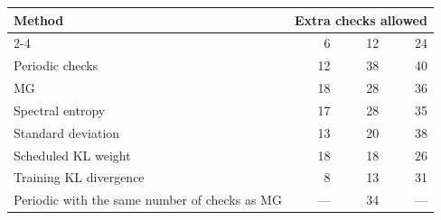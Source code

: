 \begin{tabular}{lrrr}
\toprule
Method & \multicolumn{3}{c}{Extra checks allowed} \\
\cmidrule(lr){2-4}
 & 6 & 12 & 24 \\
\midrule
Periodic checks & 12 & 38 & 40 \\
MG & 18 & 28 & 36 \\
Spectral entropy & 17 & 28 & 35 \\
Standard deviation & 13 & 20 & 38 \\
Scheduled KL weight & 18 & 18 & 26 \\
Training KL divergence & 8 & 13 & 31 \\
\addlinespace
Periodic with the same number of checks as MG & --- & 34 & --- \\
\bottomrule
\end{tabular}
